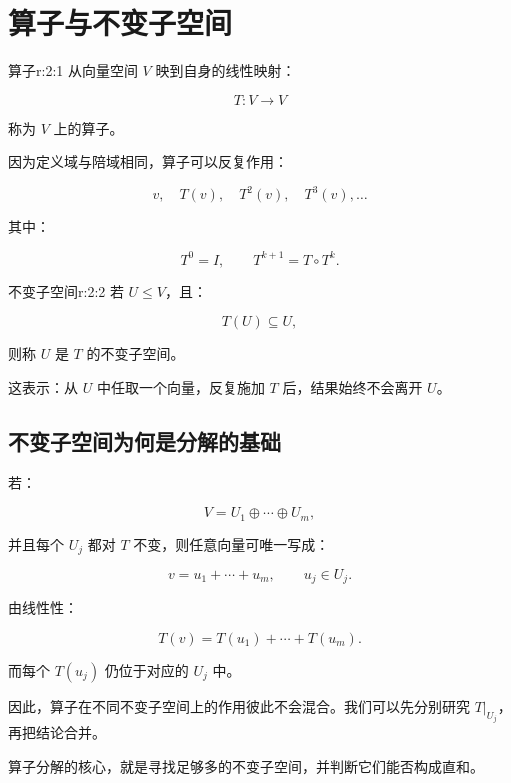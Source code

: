 
\chapter{算子与不变子空间}


\begin{jdefn}{算子}{r:2:1}
从向量空间 $V$ 映到自身的线性映射：

\[
T:V\to V
\]

称为 $V$ 上的算子。

因为定义域与陪域相同，算子可以反复作用：

\[
v,\quad T(v),\quad T^2(v),\quad T^3(v),\ldots
\]

其中：

\[
T^0=I,
\qquad
T^{k+1}=T\circ T^k.
\]
\end{jdefn}

\begin{jdefn}{不变子空间}{r:2:2}
若 $U\le V$，且：

\[
T(U)\subseteq U,
\]

则称 $U$ 是 $T$ 的不变子空间。

这表示：从 $U$ 中任取一个向量，反复施加 $T$ 后，结果始终不会离开 $U$。
\end{jdefn}

\section{不变子空间为何是分解的基础}

若：

\[
V=U_1\oplus\cdots\oplus U_m,
\]

并且每个 $U_j$ 都对 $T$ 不变，则任意向量可唯一写成：

\[
v=u_1+\cdots+u_m,
\qquad
u_j\in U_j.
\]

由线性性：

\[
T(v)=T(u_1)+\cdots+T(u_m).
\]

而每个 $T(u_j)$ 仍位于对应的 $U_j$ 中。

因此，算子在不同不变子空间上的作用彼此不会混合。我们可以先分别研究 $T|_{U_j}$，再把结论合并。

\begin{jinsight}
算子分解的核心，就是寻找足够多的不变子空间，并判断它们能否构成直和。
\end{jinsight}
